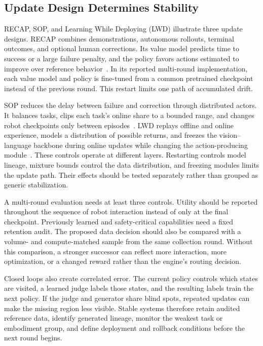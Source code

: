 \subsection{Update Design Determines Stability}

RECAP, SOP, and Learning While Deploying (LWD) illustrate three update designs. RECAP combines demonstrations, autonomous rollouts, terminal outcomes, and optional human corrections. Its value model predicts time to success or a large failure penalty, and the policy favors actions estimated to improve over reference behavior~\cite{intelligence20250_2511_14759}. In its reported multi-round implementation, each value model and policy is fine-tuned from a common pretrained checkpoint instead of the previous round. This restart limits one path of accumulated drift.

SOP reduces the delay between failure and correction through distributed actors. It balances tasks, clips each task's online share to a bounded range, and changes robot checkpoints only between episodes~\cite{pan2026sop_2601_03044}. LWD replays offline and online experience, models a distribution of possible returns, and freezes the vision--language backbone during online updates while changing the action-producing module~\cite{wang2026learning_2605_00416}. These controls operate at different layers. Restarting controls model lineage, mixture bounds control the data distribution, and freezing modules limits the update path. Their effects should be tested separately rather than grouped as generic stabilization.

A multi-round evaluation needs at least three controls. Utility should be reported throughout the sequence of robot interaction instead of only at the final checkpoint. Previously learned and safety-critical capabilities need a fixed retention audit. The proposed data decision should also be compared with a volume- and compute-matched sample from the same collection round. Without this comparison, a stronger successor can reflect more interaction, more optimization, or a changed reward rather than the engine's routing decision.

Closed loops also create correlated error. The current policy controls which states are visited, a learned judge labels those states, and the resulting labels train the next policy. If the judge and generator share blind spots, repeated updates can make the missing region less visible. Stable systems therefore retain audited reference data, identify generated lineage, monitor the weakest task or embodiment group, and define deployment and rollback conditions before the next round begins.


